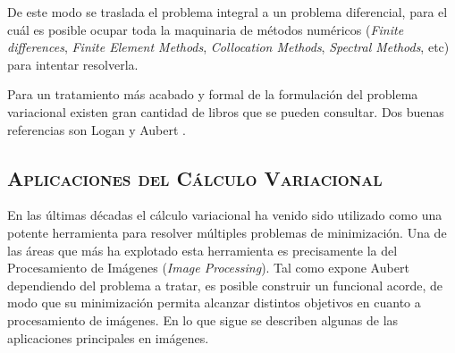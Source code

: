 De este modo se traslada el problema integral a un problema diferencial, para el cuál es posible ocupar toda la maquinaria de métodos numéricos (\textit{Finite differences}, \textit{Finite Element Methods}, \textit{Collocation Methods}, \textit{Spectral Methods}, etc) para intentar resolverla.

Para un tratamiento más acabado y formal de la formulación del problema variacional existen gran cantidad de libros que se pueden consultar.  Dos buenas referencias son Logan \cite{Logan} y Aubert \cite{Aubert}.   



\subsection{\textsc{Aplicaciones del Cálculo Variacional}}
En las últimas décadas el cálculo variacional ha venido sido utilizado como una potente herramienta para resolver múltiples problemas de minimización. Una de las áreas que más ha explotado esta herramienta es precisamente la del Procesamiento de Imágenes (\textit{Image Processing}). Tal como expone Aubert \cite{Aubert} dependiendo del problema a tratar, es posible construir un funcional acorde, de modo que su minimización permita alcanzar distintos objetivos en cuanto a procesamiento de imágenes. En lo que sigue se describen algunas de las aplicaciones principales en imágenes.

